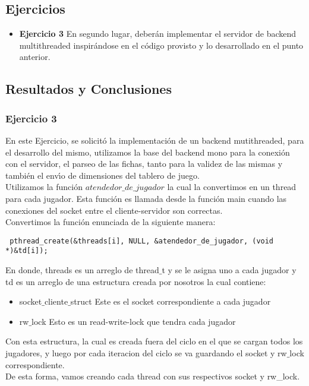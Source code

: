 
\subsection{Ejercicios}
\begin{itemize}
 \item 
\textbf{Ejercicio 3}
En segundo lugar, deberán implementar el servidor de backend multithreaded inspirándose en el código provisto y lo 
desarrollado en el punto anterior.
\end{itemize}

\subsection{Resultados y Conclusiones}


\subsubsection[Resolución Ejercicio 3]{Ejercicio 3}

\indent En este Ejercicio, se solicit\'{o} la implementación de un backend mutithreaded, para el desarrollo del mismo,
utilizamos la base del backend mono para la conexi\'{o}n con el servidor, el parseo de las fichas, tanto para la validez de las mismas
y tambi\'{e}n el env\'{\i}o de dimensiones del tablero de juego.\\

Utilizamos la función $atendedor\_de\_jugador$ la cual la convertimos en un thread para cada jugador. Esta función es llamada desde
la función main cuando las conexiones del socket entre el cliente-servidor son correctas. \\
Convertimos la función enunciada de la siguiente manera:\\
\begin{verbatim}
 pthread_create(&threads[i], NULL, &atendedor_de_jugador, (void *)&td[i]);
\end{verbatim}

En donde, threads es un arreglo de thread$\_$t y se le asigna uno a cada jugador y td es un arreglo de una estructura creada por
nosotros la cual contiene:
\begin{itemize}
 \item socket$\_$cliente$\_$struct Este es el socket correspondiente a cada jugador
 \item rw$\_$lock Esto es un read-write-lock que tendra cada jugador
\end{itemize}

Con esta estructura, la cual es creada fuera del ciclo en el que se cargan todos los jugadores, y luego por cada iteracion 
del ciclo se va guardando el socket y rw$\_$lock correspondiente.\\
De esta forma, vamos creando cada thread con sus respectivos socket y rw\_lock.\\

